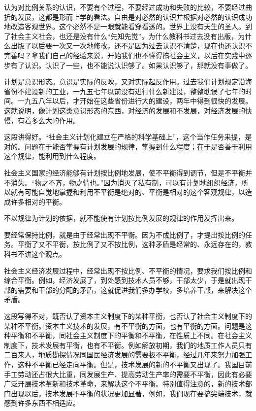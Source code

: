 认为对比例关系的认识，不要有个过程，不要经过成功和失败的比较，不要经过曲折的发展，这都是形而上学的看法。自由是对必然的认识并根据对必然的认识成功地改造客观世界。这个必然不是一眼就能看穿看透的。世界上没有天生的圣人。到了社会主义社会，也还是没有什么“先知先觉”。为什么教科书过去没有出版，为什么出版了以后要一次又一次地修改，还不是因为过去认识不清楚，现在也还认识不完善吗？拿我们自己的经验来说，开始我们也不懂得搞社会主义，以后在实践中逐步有了认识。认识了一些，也不能说认识够了。如果认识够了，那就没有事做了。

计划是意识形态。意识是实际的反映，又对实际起反作用。过去我们计划规定沿海省份不建设新的工业，一九五七年以前没有进行什么新建设，整整耽误了七年的时间。一九五八年以后，才开始在这些省份进行大的建设，两年中得到很快的发展。这就说明，像计划这类意识形态的东西，对经济的发展和不发展，对经济发展的快慢，有着多么大的作用。

这段讲得好。“社会主义计划化建立在严格的科学基础上”，这个当作任务来提，是对的。问题在于能否掌握有计划发展的规律，掌握到什么程度；在于是否善于利用这个规律，能利用到什么程度。

社会主义国家的经济能够有计划按比例地发展，使不平衡得到调节，但是不平衡并不消失。“物之不齐，物之情也。”因为消灭了私有制，可以有计划地组织经济，所以就有可能自觉地掌握和利用不平衡是绝对的、平衡是相对的这个客观规律，以造成许多相对的平衡。

不以规律为计划的依据，就不能使有计划按比例发展的规律的作用发挥出来。

要经常保持比例，就是由于经常出现不平衡。因为不成比例了，才提出按比例的任务。平衡了又不平衡，按比例了又不按比例，这种矛盾是经常的、永远存在的，教科书不讲这个观点。

社会主义经济发展过程中，经常出现不按比例、不平衡的情况，要求我们按比例和综合平衡。例如，经济发展了，到处感到技术人员不够，干部太少，于是就出现干部的需要和干部的分配的矛盾，这就促进我们多办学校，多培养干部，来解决这个矛盾。

这段写得不对，既否认了资本主义制度下的某种平衡，也否认了社会主义制度下的某种不平衡。资本主义技术的发展，有不平衡的方面，也有平衡的方面。问题是这种平衡和不平衡，同社会主义制度下的平衡和不平衡，在性质上不同。在社会主义制度下，技术发展有平衡，也有不平衡。例如解放初期，我们的地质工作人员只有二百来人，地质勘探情况同国民经济发展的需要极不平衡，经过几年来努力加强工作，这种不平衡已经走向平衡。但是，技术发展的新的不平衡又出现了。我国目前手工劳动还占很大比重，同发展生产、提高劳动生产率的需要不平衡，因此有必要广泛开展技术革新和技术革命，来解决这个不平衡。特别值得注意的，新的技术部门出现以后，技术发展不平衡的状况更加显著，例如，我们现在要搞尖端技术，就感到许多东西不相适应。

